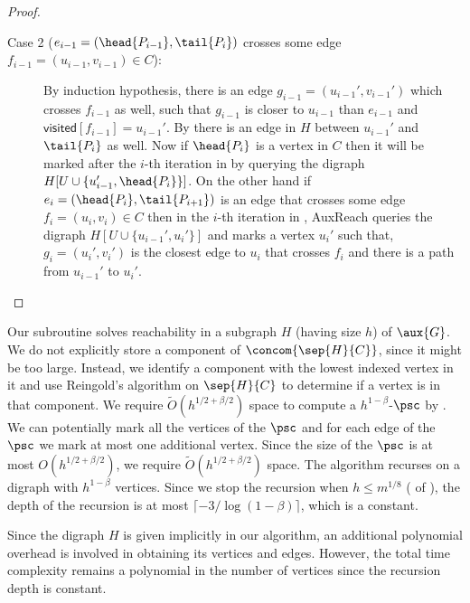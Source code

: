 \documentclass{toc}
\begin{document}
\begin{proof}
\begin{description}
\item[Case 2 ($e_{i-1} = (\head{P_{i-1}} , \tail{P_{i}})$ crosses some edge $f_{i-1} = (u_{i-1},v_{i-1}) \in C$):] By induction hypothesis, there is an edge $g_{i-1} = (u_{i-1}',v_{i-1}')$ which crosses $f_{i-1}$ as well, such that $g_{i-1}$ is closer to $u_{i-1}$ than $e_{i-1}$ and $\textsf{visited}[f_{i-1}] = u_{i-1}'$. By  there is an edge in $H$ between $u_{i-1}'$ and $\tail{P_{i}}$ as well.
Now if $\head{P_i}$ is a vertex in $C$ then it will be marked after the $i$-th iteration in  by querying the %
digraph %
 $H[U \cup \{u_{i-1}', \head{P_i}\}]$. On the other hand if $e_i = (\head{P_i} , \tail{P_{i+1}})$ is an edge that crosses some edge $f_i = (u_i,v_i) \in C$ then in the $i$-th iteration in , \textsf{AuxReach} queries the %
digraph %
 $H[U \cup \{u_{i-1}', u_i'\}]$ and marks a vertex $u_i'$ such that, $g_i = (u_i',v_i')$ is the closest edge to $u_i$ that crosses $f_i$ and there is a path from $u_{i-1}'$ to $u_i'$.\qedhere\end{description}\end{proof}

Our subroutine %
%
solves  %
reachability in a subgraph $H$ (having size $h$) of $\aux{G}$. We do not explicitly store a component of $\concom{\sep{H}{C}}$, since it might be too large. Instead, we identify a component with the lowest indexed vertex %
 in it and use Reingold's algorithm on $\sep{H}{C}$ to determine if a vertex is %
 in that component. We require $\widetilde{O}(h^{1/2 + \beta/2})$ space to compute a $h^{1-\beta}$-$\psc$ by . We can potentially mark all the vertices of the $\psc$ and for each edge of
the  %
$\psc$ we mark at most one additional vertex. Since the size of
the  %
$\psc$ is at most $O(h^{1/2 + \beta/2})$, we require $\widetilde{O}(h^{1/2 + \beta/2})$ space. The algorithm recurses on a %
digraph %
 with $h^{1 - \beta}$ vertices.  %
Since we stop the recursion when $h \le m^{1/8}$
( of ), %
the depth of the recursion is at most
%
$\lceil -3/\log(1-\beta)\rceil$,  %
which is a constant.

Since the %
digraph %
 $H$ is given implicitly in our algorithm, an additional polynomial overhead is involved in obtaining its vertices and edges. However, the total time complexity %
remains  %
a polynomial in the number of vertices since the recursion depth is constant.
\end{document}
